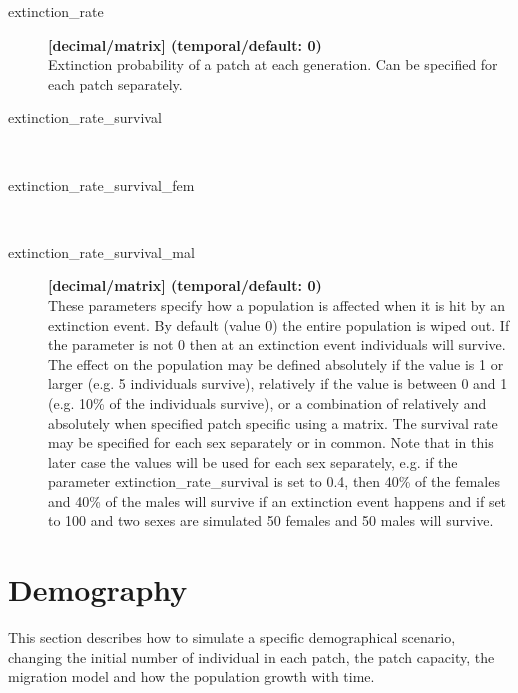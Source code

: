 \documentclass[letterpaper,12pt,oneside]{book}
\begin{document}
\begin{description}
\item[extinction\_rate] \textbf{[decimal/matrix] (temporal/default: 0)}\\
Extinction probability of a patch at each generation. Can be specified for each patch separately.

\item[extinction\_rate\_survival]\hspace*{\fill}\\
\vspace{-9mm}
\item[extinction\_rate\_survival\_fem]\hspace*{\fill}\\
\vspace{-9mm}
\item[extinction\_rate\_survival\_mal] \textbf{[decimal/matrix] (temporal/default: 0)}\\
These parameters specify how a population is affected when it is hit by an extinction event. By default (value 0) the entire population is wiped out. If the parameter is not 0 then at an extinction event individuals will survive. The effect on the population may be defined absolutely if the value is 1 or larger (e.g. 5 individuals survive), relatively if the value is between 0 and 1 (e.g. 10\% of the individuals survive), or a combination of relatively and absolutely when specified patch specific  using a matrix. The survival rate may be specified for each sex separately or in common. Note that in this later case the values will be used for each sex separately, e.g. if the parameter \textsf{extinction\_rate\_survival} is set to 0.4, then 40\% of the females and 40\% of the males will survive if an extinction event happens and if set to 100 and two sexes are simulated 50 females and 50 males will survive.

\end{description}


\newpage
\chapter{Demography}\label{chap:Demography}
This section describes how to simulate a specific demographical scenario, changing the initial number of individual in each patch, the patch capacity, the migration model and how the population growth with time. 
\end{document}
